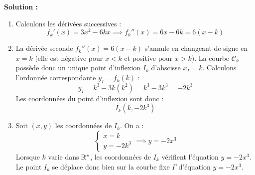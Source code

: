 \textbf{Solution :}
\begin{enumerate}
    \item Calculons les dérivées successives :
    \[
    f_k'(x) = 3x^2 - 6kx \implies f_k''(x) = 6x - 6k = 6(x-k)
    \]
    
    \item La dérivée seconde $f_k''(x) = 6(x-k)$ s'annule en changeant de signe en $x = k$ (elle est négative pour $x < k$ et positive pour $x > k$).
    La courbe $\mathcal{C}_k$ possède donc un unique point d'inflexion $I_k$ d'abscisse $x_I = k$.
    Calculons l'ordonnée correspondante $y_I = f_k(k)$ :
    \[
    y_I = k^3 - 3k(k^2) = k^3 - 3k^3 = -2k^3
    \]
    Les coordonnées du point d'inflexion sont donc :
    \[
    I_k(k, -2k^3)
    \]
    
    \item Soit $(x, y)$ les coordonnées de $I_k$. On a :
    \[
    \begin{cases}
    x = k \\
    y = -2k^3
    \end{cases} \implies y = -2x^3
    \]
    Lorsque $k$ varie dans $\mathbb{R}^*$, les coordonnées de $I_k$ vérifient l'équation $y = -2x^3$. Le point $I_k$ se déplace donc bien sur la courbe fixe $\Gamma$ d'équation $y = -2x^3$.
\end{enumerate}

